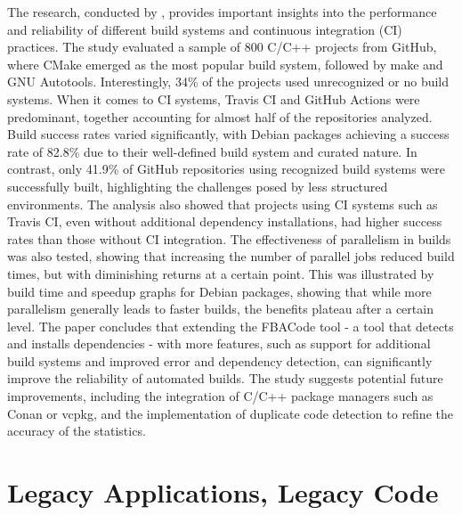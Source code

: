 The research, conducted by \citet{gygiCppBuildLargeScaleAutomatic2021}, provides important insights into the performance and reliability of different build systems and continuous integration (CI) practices.
The study evaluated a sample of 800 C/C++ projects from GitHub, where CMake emerged as the most popular build system, followed by make and GNU Autotools.
Interestingly, 34\% of the projects used unrecognized or no build systems.
When it comes to CI systems, Travis CI and GitHub Actions were predominant, together accounting for almost half of the repositories analyzed.
Build success rates varied significantly, with Debian packages achieving a success rate of 82.8\% due to their well-defined build system and curated nature.
In contrast, only 41.9\% of GitHub repositories using recognized build systems were successfully built, highlighting the challenges posed by less structured environments.
The analysis also showed that projects using CI systems such as Travis CI, even without additional dependency installations, had higher success rates than those without CI integration.
The effectiveness of parallelism in builds was also tested, showing that increasing the number of parallel jobs reduced build times, but with diminishing returns at a certain point.
This was illustrated by build time and speedup graphs for Debian packages, showing that while more parallelism generally leads to faster builds, the benefits plateau after a certain level.
The paper concludes that extending the FBACode tool - a tool that detects and installs dependencies - with more features, such as support for additional build systems and improved error and dependency detection, can significantly improve the reliability of automated builds.
The study suggests potential future improvements, including the integration of C/C++ package managers such as Conan or vcpkg, and the implementation of duplicate code detection to refine the accuracy of the statistics.

\section{Legacy Applications, Legacy Code}


